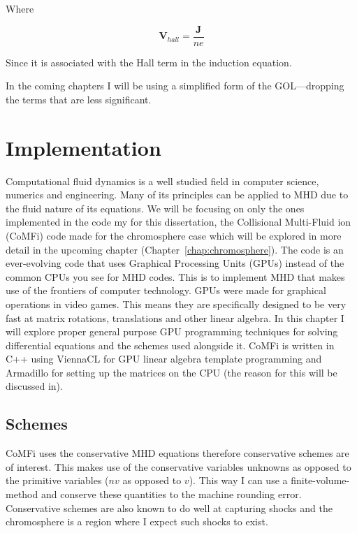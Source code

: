 \documentclass[12pt,upcase]{umlthesis}
\begin{document}
Where

\begin{equation}
	\textbf{V}_{hall} = \frac{\textbf{J}}{ne}
\end{equation}

Since it is associated with the Hall term in the induction equation.

In the coming chapters I will be using a simplified form of the GOL---dropping the terms that are less significant.

\chapter{Implementation}\label{chap:implementation}

Computational fluid dynamics is a well studied field in computer science, numerics and engineering. Many of its principles can be applied to MHD due to the fluid nature of its equations. We will be focusing on only the ones implemented in the code my for this dissertation, the Collisional Multi-Fluid ion (CoMFi) code made for the chromosphere case which will be explored in more detail in the upcoming chapter (Chapter~\ref{chap:chromosphere}). The code is an ever-evolving code that uses Graphical Processing Units (GPUs) instead of the common CPUs you see for MHD codes. This is to implement MHD that makes use of the frontiers of computer technology. GPUs were made for graphical operations in video games. This means they are specifically designed to be very fast at matrix rotations, translations and other linear algebra. In this chapter I will explore proper general purpose GPU programming techniques for solving differential equations and the schemes used alongside it. CoMFi is written in C++ using ViennaCL for GPU linear algebra template programming and Armadillo for setting up the matrices on the CPU (the reason for this will be discussed in).

\section{Schemes}\label{sec:schemes}

CoMFi uses the conservative MHD equations therefore conservative schemes are of interest. This makes use of the conservative variables unknowns as opposed to the primitive variables ($n v$ as opposed to $v$). This way I can use a finite-volume-method and conserve these quantities to the machine rounding error. Conservative schemes are also known to do well at capturing shocks and the chromosphere is a region where I expect such shocks to exist.
\end{document}
